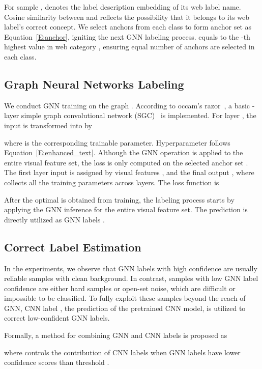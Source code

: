 \documentclass[sigconf]{acmart}
\begin{document}
	For sample ,  denotes the label description embedding of its web label name. Cosine similarity between  and  reflects the possibility that it belongs to its web label's correct concept.
	We select  anchors from each class to form anchor set  as Equation~\ref{E:anchor}, igniting the next GNN labeling process.  equals to the -th highest value in web category , ensuring equal number of anchors are selected in each class.
	
	
	
	\subsection{Graph Neural Networks Labeling}
	\label{S:gnn}
	We conduct GNN training on the graph . According to occam's razor~\cite{blumer1987occam}, a basic -layer simple graph convolutional network (SGC)~\cite{wu2019simplifying} is implemented. For layer , the input  is transformed into  by
	
	where  is the corresponding trainable parameter. Hyperparameter  follows Equation~\ref{E:enhanced_text}.
    Although the GNN operation is applied to the entire visual feature set, the loss is only computed on the selected anchor set . The first layer input  is assigned by visual features , and the final output , where  collects all the training parameters  across layers. The loss function is
	
	
	After the optimal  is obtained from training, the labeling process starts by applying the GNN inference for the entire visual feature set. The prediction  is directly utilized as GNN labels .
	
	\subsection{Correct Label Estimation}
	\label{S:final-label}
	In the experiments, we observe that GNN labels with high confidence are usually reliable samples with clean background.
In contrast, samples with low GNN label confidence are either hard samples or open-set noise, which are difficult or impossible to be classified. To fully exploit these samples beyond the reach of GNN, CNN label , the prediction of the pretrained CNN model, is utilized to correct low-confident GNN labels.
    
    Formally, a method for combining GNN and CNN labels is proposed as

	
	where  controls the contribution of CNN labels when GNN labels have lower confidence scores than threshold .
    
\end{document}

